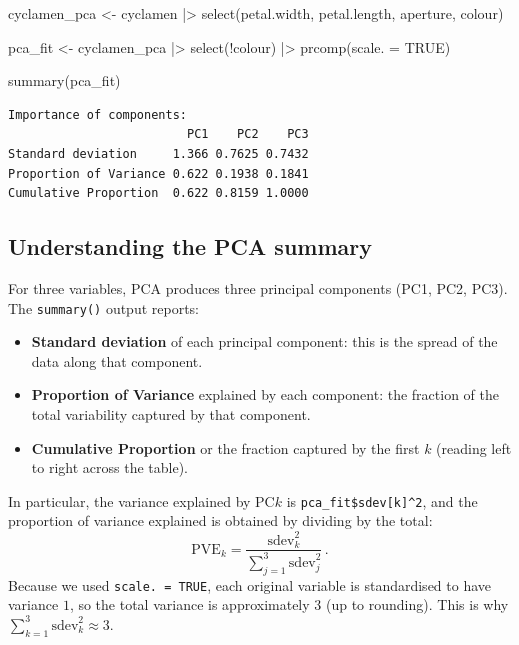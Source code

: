 \documentclass[
  a4paper,
  DIV=11,
  numbers=noendperiod,
  oneside]{scrreprt}
\newenvironment{Shaded}{\begin{snugshade}}{\end{snugshade}}
\newcommand{\AttributeTok}[1]{\textcolor[rgb]{0.40,0.45,0.13}{#1}}
\newcommand{\ConstantTok}[1]{\textcolor[rgb]{0.56,0.35,0.01}{#1}}
\newcommand{\FunctionTok}[1]{\textcolor[rgb]{0.28,0.35,0.67}{#1}}
\newcommand{\NormalTok}[1]{\textcolor[rgb]{0.00,0.23,0.31}{#1}}
\newcommand{\OtherTok}[1]{\textcolor[rgb]{0.00,0.23,0.31}{#1}}
\newcommand{\SpecialCharTok}[1]{\textcolor[rgb]{0.37,0.37,0.37}{#1}}
\providecommand{\tightlist}{%
  \setlength{\itemsep}{0pt}\setlength{\parskip}{0pt}}
\theoremstyle{plain}
\theoremstyle{definition}
\theoremstyle{definition}
\theoremstyle{definition}
\theoremstyle{plain}
\theoremstyle{remark}
\begin{document}
\begin{Shaded}
\begin{Highlighting}[]
\NormalTok{cyclamen\_pca }\OtherTok{\textless{}{-}}\NormalTok{ cyclamen }\SpecialCharTok{|\textgreater{}}
    \FunctionTok{select}\NormalTok{(petal.width, petal.length, aperture, colour)}

\NormalTok{pca\_fit }\OtherTok{\textless{}{-}}\NormalTok{ cyclamen\_pca }\SpecialCharTok{|\textgreater{}} 
    \FunctionTok{select}\NormalTok{(}\SpecialCharTok{!}\NormalTok{colour) }\SpecialCharTok{|\textgreater{}}
    \FunctionTok{prcomp}\NormalTok{(}\AttributeTok{scale. =} \ConstantTok{TRUE}\NormalTok{)}

\FunctionTok{summary}\NormalTok{(pca\_fit)}
\end{Highlighting}
\end{Shaded}

\begin{verbatim}
Importance of components:
                         PC1    PC2    PC3
Standard deviation     1.366 0.7625 0.7432
Proportion of Variance 0.622 0.1938 0.1841
Cumulative Proportion  0.622 0.8159 1.0000
\end{verbatim}

\subsection{Understanding the PCA
summary}\label{understanding-the-pca-summary}

For three variables, PCA produces three principal components (PC1, PC2,
PC3). The \texttt{summary()} output reports:

\begin{itemize}
\tightlist
\item
  \textbf{Standard deviation} of each principal component: this is the
  spread of the data along that component.
\item
  \textbf{Proportion of Variance} explained by each component: the
  fraction of the total variability captured by that component.
\item
  \textbf{Cumulative Proportion} or the fraction captured by the first
  \(k\) (reading left to right across the table).
\end{itemize}

In particular, the variance explained by PC\(k\) is
\texttt{pca\_fit\$sdev{[}k{]}\^{}2}, and the proportion of variance
explained is obtained by dividing by the total:
\[\mathrm{PVE}_k = \frac{\mathrm{sdev}_k^2}{\sum_{j=1}^3 \mathrm{sdev}_j^2} \,.\]
Because we used \texttt{scale.\ =\ TRUE}, each original variable is
standardised to have variance \(1\), so the total variance is
approximately \(3\) (up to rounding). This is why
\(\sum_{k=1}^3 \mathrm{sdev}_k^2 \approx 3\).
\end{document}
